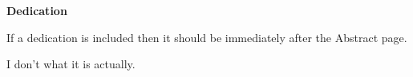 \begin{center}
\LARGE\textbf {Dedication}
\end{center}
\vspace{5pt}

If a dedication is included then it should be immediately after the Abstract page.\par
I don't what it is actually.